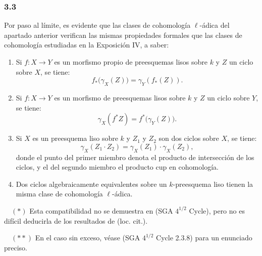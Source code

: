 \subsubsection*{3.3}
Por paso al límite, es evidente que las clases de cohomología \(\ell\)-ádica del apartado anterior verifican las mismas propiedades formales que las clases de cohomología estudiadas en la Exposición IV, a saber:

\begin{enumerate}[label=(\roman*)]
\item Si \(f:X\to Y\) es un morfismo propio de preesquemas lisos sobre \(k\) y \(Z\) un ciclo sobre \(X\), se tiene:
\[
f_*\bigl(\gamma_X(Z)\bigr)=\gamma_Y(f_*(Z)).
\tag{*}
\]

\item Si \(f:X\to Y\) es un morfismo de preesquemas lisos sobre \(k\) y \(Z\) un ciclo sobre \(Y\), se tiene:
\[
\gamma_X(f^*Z)=f^*\bigl(\gamma_Y(Z)\bigr).
\tag{**}
\]

\item Si \(X\) es un preesquema liso sobre \(k\) y \(Z_1\) y \(Z_2\) son dos ciclos sobre \(X\), se tiene:
\[
\gamma_X(Z_1\cdot Z_2)=\gamma_X(Z_1)\cdot \gamma_X(Z_2),
\tag{**}
\]
donde el punto del primer miembro denota el producto de intersección de los ciclos, y el del segundo miembro el producto cup en cohomología.

\item Dos ciclos algebraicamente equivalentes sobre un \(k\)-preesquema liso tienen la misma clase de cohomología \(\ell\)-ádica.
\end{enumerate}

\begin{flushleft}
\(\quad (*)\) Esta compatibilidad no se demuestra en (SGA \(4^{1/2}\) Cycle), pero no es difícil deducirla de los resultados de (loc. cit.).

\(\quad (**)\) En el caso sin exceso, véase (SGA \(4^{1/2}\) Cycle 2.3.8) para un enunciado preciso.
\end{flushleft}
